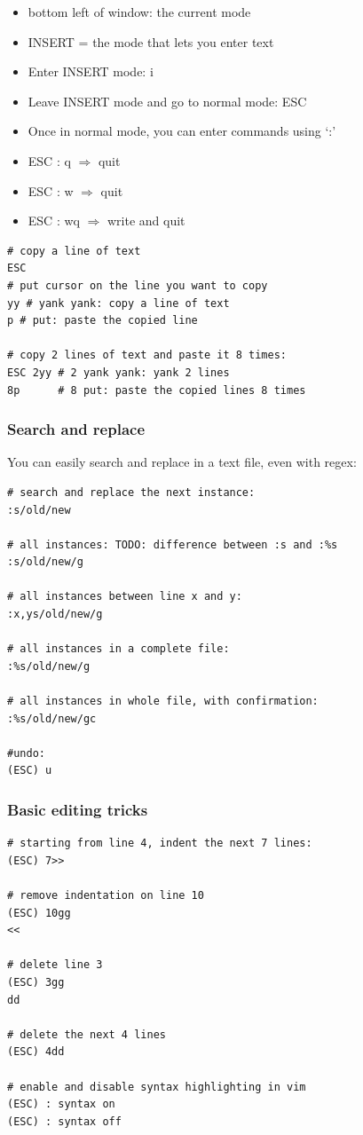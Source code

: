 \documentclass{article}
\begin{document}
\begin{itemize}
    \item bottom left of window: the current mode
    \item INSERT = the mode that lets you enter text
    \item Enter INSERT mode: i
    \item Leave INSERT mode and go to normal mode: ESC
    \item Once in normal mode, you can enter commands using `:'
    \item ESC : q $\Rightarrow$ quit
    \item ESC : w $\Rightarrow$ quit
    \item ESC : wq $\Rightarrow$ write and quit
\end{itemize}

\begin{verbatim}
# copy a line of text
ESC
# put cursor on the line you want to copy
yy # yank yank: copy a line of text
p # put: paste the copied line

# copy 2 lines of text and paste it 8 times:
ESC 2yy # 2 yank yank: yank 2 lines
8p      # 8 put: paste the copied lines 8 times
\end{verbatim}

\subsubsection{Search and replace}

You can easily search and replace in a text file, even with regex:

\begin{verbatim}
# search and replace the next instance:
:s/old/new

# all instances: TODO: difference between :s and :%s
:s/old/new/g

# all instances between line x and y:
:x,ys/old/new/g

# all instances in a complete file:
:%s/old/new/g

# all instances in whole file, with confirmation:
:%s/old/new/gc

#undo:
(ESC) u
\end{verbatim}

\subsubsection{Basic editing tricks}

\begin{verbatim}
# starting from line 4, indent the next 7 lines:
(ESC) 7>>

# remove indentation on line 10
(ESC) 10gg
<<

# delete line 3
(ESC) 3gg
dd

# delete the next 4 lines
(ESC) 4dd

# enable and disable syntax highlighting in vim
(ESC) : syntax on
(ESC) : syntax off
\end{verbatim}
\end{document}

